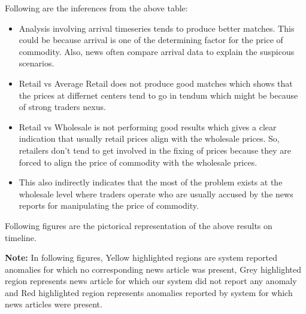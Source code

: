 \documentclass[a4paper,10pt]{article}
\begin{document}
Following are the inferences from the above table:
\begin{itemize}
 \item Analysis involving arrival timeseries tends to produce better matches. This could be because arrival is one of the determining factor for the price of commodity. Also, news often compare arrival data to explain the suspicous scenarios.
 \item Retail vs Average Retail does not produce good matches which shows that the prices at differnet centers tend to go in tendum which might be because of strong traders nexus.
 \item Retail vs Wholesale is not performing good results which gives a clear indication that usually retail prices align with the wholesale prices. So, retailers don't tend to get involved in the fixing of prices because they are forced to align the price of commodity with the wholesale prices.
 \item This also indirectly indicates that the most of the problem exists at the wholesale level where traders operate who are usually accused by the news reports for manipulating the price of commodity.
\end{itemize}



Following figures are the pictorical representation of the above results on timeline.

\textbf{Note:} In following figures, Yellow highlighted regions are system reported anomalies for which no corresponding news article was present, Grey highlighted region represents news article for which our system did not report any anomaly and Red highlighted region represents anomalies reported by system for which news articles were present.
\end{document}
